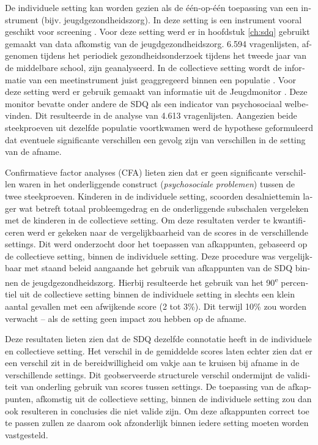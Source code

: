 \begin{otherlanguage}{dutch}
De individuele setting kan worden gezien als de \'e\'en-op-\'e\'en toepassing van een instrument (bijv. jeugdgezondheidszorg). In deze setting is een instrument vooral geschikt voor screening \parencite{Vogels_2009, Widenfelt_2003, Goodman_2001}. Voor deze setting werd er in hoofdstuk \ref{ch:sdq} gebruikt gemaakt van data afkomstig van de jeugdgezondheidszorg. 6.594 vragenlijsten, afgenomen tijdens het periodiek gezondheidsonderzoek tijdens het tweede jaar van de middelbare school, zijn geanalyseerd. In de collectieve setting wordt de informatie van een meetinstrument juist geaggregeerd binnen een populatie \parencite{Roy_2006,Becker_2006,Ravens_2008}. Voor deze setting werd er gebruik gemaakt van informatie uit de Jeugdmonitor \parencite{Youth_2014a}. Deze monitor bevatte onder andere de SDQ als een indicator van psychosociaal welbevinden. Dit resulteerde in de analyse van 4.613 vragenlijsten. Aangezien beide steekproeven uit dezelfde populatie voortkwamen werd de hypothese geformuleerd dat eventuele significante verschillen een gevolg zijn van verschillen in de setting van de afname.

Confirmatieve factor analyses (CFA) lieten zien dat er geen significante verschillen waren in het onderliggende construct (\textit{psychosociale problemen}) tussen de twee steekproeven. Kinderen in de individuele setting, scoorden desalniettemin lager wat betreft totaal probleemgedrag en de onderliggende subschalen vergeleken met de kinderen in de collectieve setting. Om deze resultaten verder te kwantificeren werd er gekeken naar de vergelijkbaarheid van de scores in de verschillende settings. Dit werd onderzocht door het toepassen van afkappunten, gebaseerd op de collectieve setting, binnen de individuele setting. Deze procedure was vergelijkbaar met staand beleid aangaande het gebruik van afkappunten van de SDQ binnen de jeugdgezondheidszorg. Hierbij resulteerde het gebruik van het 90\textsuperscript{e} percentiel uit de collectieve setting binnen de individuele setting in slechts een klein aantal gevallen met een afwijkende score (2 tot 3\%). Dit terwijl 10\% zou worden verwacht -- als de setting geen impact zou hebben op de afname. 

Deze resultaten lieten zien dat de SDQ dezelfde connotatie heeft in de individuele en collectieve setting. Het verschil in de gemiddelde scores laten echter zien dat er een verschil zit in de bereidwilligheid om vakje aan te kruisen bij afname in de verschillende settings. Dit geobserveerde structurele verschil ondermijnt de validiteit van onderling gebruik van scores tussen settings. De toepassing van de afkappunten, afkomstig uit de collectieve setting, binnen de individuele setting zou dan ook resulteren in conclusies die niet valide zijn. Om deze afkappunten correct toe te passen zullen ze daarom ook afzonderlijk binnen iedere setting moeten worden vastgesteld.


\end{otherlanguage}
